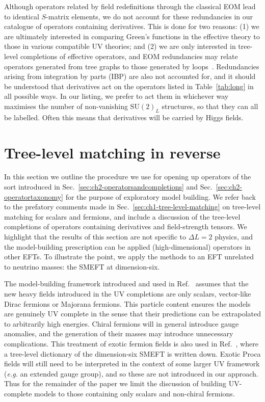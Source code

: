 Although operators related by field redefinitions through the classical EOM lead
to identical $S$-matrix elements, we do not account for these redundancies in
our catalogue of operators containing derivatives. This is done for two reasons:
(1) we are ultimately interested in comparing Green's functions in the effective
theory to those in various compatible UV theories; and (2) we are only
interested in tree-level completions of effective operators, and EOM
redundancies may relate operators generated from tree graphs to those generated
by loops~\cite{Arzt:1994gp, Einhorn:2013kja}. Redundancies arising from
integration by parts (IBP) are also not accounted for, and it should be
understood that derivatives act on the operators listed in Table~\ref{tab:long}
in all possible ways. In our listing, we prefer to act them in whichever way
maximises the number of non-vanishing $\mathrm{SU}(2)_{L}$ structures, so that
they can all be labelled. Often this means that derivatives will be carried by
Higgs fields.

\section{Tree-level matching in reverse}
\label{sec:ch2-treelevelmatching}

In this section we outline the procedure we use for opening up operators of the
sort introduced in Sec.~\ref{sec:ch2-operatorsandcompletions} and
Sec.~\ref{sec:ch2-operatortaxonomy} for the purpose of exploratory model building.
We refer back to the prefatory comments made in
Sec.~\ref{sec:ch1-tree-level-matching} on tree-level matching for scalars and
fermions, and include a discussion of the tree-level completions of operators
containing derivatives and field-strength tensors. We highlight that the results
of this section are not specific to $\Delta L = 2$ physics, and the
model-building prescription can be applied (high-dimensional) operators in other
EFTs. To illustrate the point, we apply the methods to an EFT unrelated to
neutrino masses: the SMEFT at dimension-six.

The model-building framework introduced and used in Ref.~\cite{Angel:2012ug}
assumes that the new heavy fields introduced in the UV completions are only
scalars, vector-like Dirac fermions or Majorana fermions. This particle content
ensures the models are genuinely UV complete in the sense that their predictions
can be extrapolated to arbitrarily high energies. Chiral fermions will in
general introduce gauge anomalies, and the generation of their masses may
introduce unnecessary complications. This treatment of exotic fermion fields is
also used in Ref.~\cite{deBlas:2017xtg}, where a tree-level dictionary of the
dimension-six SMEFT is written down. Exotic Proca fields will still need to be
interpreted in the context of some larger UV framework (\textit{e.g.} an
extended gauge group), and so these are not introduced in our approach. Thus for
the remainder of the paper we limit the discussion of building UV-complete
models to those containing only scalars and non-chiral fermions.

